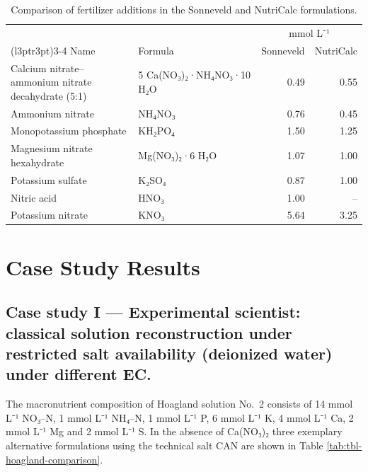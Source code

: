 \documentclass[
  letterpaper,
  DIV=11,
  numbers=noendperiod]{scrreprt}
\begin{document}
\begin{longtable}[t]{llrr}

\caption{\label{tbl-fertilizer-comparison}Comparison of fertilizer
additions in the Sonneveld and NutriCalc formulations.}

\tabularnewline

\\
\toprule
\multicolumn{2}{c}{ } & \multicolumn{2}{c}{mmol L⁻¹} \\
\cmidrule(l{3pt}r{3pt}){3-4}
Name & Formula & Sonneveld & NutriCalc\\
\midrule
Calcium nitrate–ammonium nitrate decahydrate (5:1) & 5 Ca(NO₃)₂·NH₄NO₃·10 H₂O & 0.49 & 0.55\\
Ammonium nitrate & NH₄NO₃ & 0.76 & 0.45\\
Monopotassium phosphate & KH₂PO₄ & 1.50 & 1.25\\
Magnesium nitrate hexahydrate & Mg(NO₃)₂·6 H₂O & 1.07 & 1.00\\
Potassium sulfate & K₂SO₄ & 0.87 & 1.00\\
\addlinespace
Nitric acid & HNO₃ & 1.00 & –\\
Potassium nitrate & KNO₃ & 5.64 & 3.25\\
\bottomrule

\end{longtable}

\endgroup{}

\newpage

\section{Case Study Results}\label{case-study-results}

\subsection{Case study I --- Experimental scientist: classical solution
reconstruction under restricted salt availability (deionized water)
under different
EC.}\label{case-study-i-experimental-scientist-classical-solution-reconstruction-under-restricted-salt-availability-deionized-water-under-different-ec.}

The macronutrient composition of Hoagland solution No.~2 consists of 14
mmol L⁻¹ NO₃--N, 1 mmol L⁻¹ NH₄--N, 1 mmol L⁻¹ P, 6 mmol L⁻¹ K, 4 mmol
L⁻¹ Ca, 2 mmol L⁻¹ Mg and 2 mmol L⁻¹ S. In the absence of Ca(NO₃)₂ three
exemplary alternative formulations using the technical salt CAN are
shown in Table \ref{tab:tbl-hoagland-comparison}.
\end{document}
